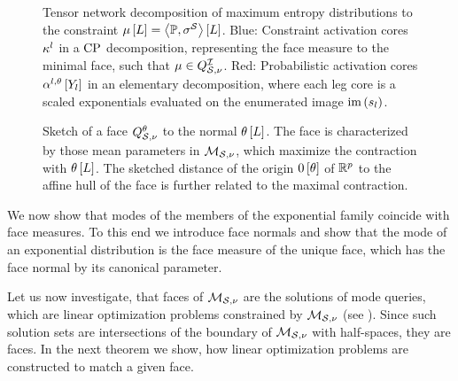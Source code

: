\begin{figure}
    \begin{center}
        
    \end{center}
    \caption{
        Tensor network decomposition of maximum entropy distributions to the constraint $\mu\left[L\right]=\left\langle \mathbb{P},\sigma^{\mathcal{S}}\right\rangle \left[ L \right]$.
        Blue: Constraint activation cores $\kappa^{l}$ in a $\mathrm{CP}$ decomposition, representing the face measure to the minimal face, such that $\mu\in Q^{\mathcal{I}}_{\mathcal{S},\nu}$.
        Red: Probabilistic activation cores $\alpha^{l,\theta}\left[Y_{l}\right]$ in an elementary decomposition, where each leg core is a scaled exponentials evaluated on the enumerated image $\mathrm{im}\left(s_{l}\right)$.
    }\label{fig:maxEntropyActcore}
\end{figure}




\begin{figure}[t!]
    \begin{center}
        
    \end{center}
    \caption{Sketch of a face $Q^{\theta}_{\mathcal{S},\nu}$ to the normal $\theta\left[L\right]$.
    The face is characterized by those mean parameters in $\mathcal{M}_{\mathcal{S},\nu}$, which maximize the contraction with $\theta\left[L\right]$.
    The sketched distance of the origin $0\left[\theta\right]$ of $\mathbb{R}^{p}$ to the affine hull of the face is further related to the maximal contraction.
    }\label{fig:meansetSketchFace}
\end{figure}

We now show that modes of the members of the exponential family coincide with face measures.
To this end we introduce face normals and show that the mode of an exponential distribution is the face measure of the unique face, which has the face normal by its canonical parameter.


Let us now investigate, that faces of $\mathcal{M}_{\mathcal{S},\nu}$ are the solutions of mode queries, which are linear optimization problems constrained by $\mathcal{M}_{\mathcal{S},\nu}$ (see ).
Since such solution sets are intersections of the boundary of $\mathcal{M}_{\mathcal{S},\nu}$ with half-spaces, they are faces.
In the next theorem we show, how linear optimization problems are constructed to match a given face.

